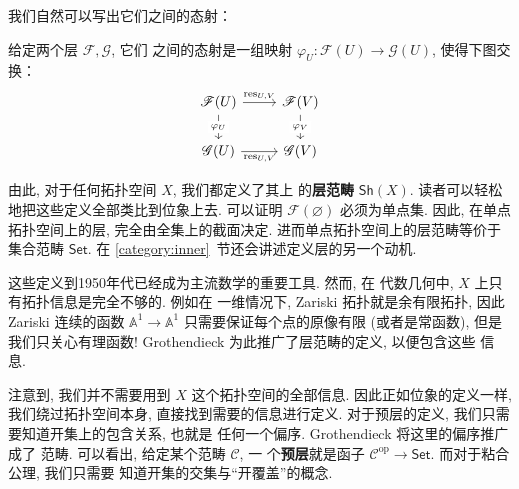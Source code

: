 我们自然可以写出它们之间的态射：
\begin{definition}
给定两个层 \(\mathscr F, \mathscr G\), 它们
之间的态射是一组映射 \(\varphi_U : \mathscr F(U) \to \mathscr G(U)\),
使得下图交换：
\[\begin{tikzcd}
{\mathscr F(U)} & {\mathscr F(V)} \\
{\mathscr G(U)} & {\mathscr G(V)}
\arrow["{\mathrm{res}_{U,V}}", from=1-1, to=1-2]
\arrow["{\mathrm{res}_{U,V}}"', from=2-1, to=2-2]
\arrow["{\varphi_U}"{description}, from=1-1, to=2-1]
\arrow["{\varphi_V}"{description}, from=1-2, to=2-2]
\end{tikzcd}\]
\end{definition}
由此, 对于任何拓扑空间 \(X\), 我们都定义了其上
的\textbf{层范畴} \(\mathsf{Sh}(X)\).
读者可以轻松地把这些定义全部类比到位象上去.
可以证明 \(\mathscr F(\varnothing)\) 必须为单点集.
因此, 在单点拓扑空间上的层, 完全由全集上的截面决定.
进而单点拓扑空间上的层范畴等价于集合范畴 \(\mathsf{Set}\).
在 \ref{category:inner}~节还会讲述定义层的另一个动机.

这些定义到1950年代已经成为主流数学的重要工具. 然而, 在
代数几何中, \(X\) 上只有拓扑信息是完全不够的. 例如在
一维情况下, Zariski 拓扑就是余有限拓扑, 因此 Zariski
连续的函数 \(\mathbb A^1 \to \mathbb A^1\)
只需要保证每个点的原像有限 (或者是常函数), 但是我们只关心有理函数!
Grothendieck 为此推广了层范畴的定义, 以便包含这些
信息.

注意到, 我们并不需要用到 \(X\) 这个拓扑空间的全部信息.
因此正如位象的定义一样, 我们绕过拓扑空间本身, 直接找到需要的信息进行定义.
对于预层的定义, 我们只需要知道开集上的包含关系, 也就是
任何一个偏序. Grothendieck 将这里的偏序推广成了
范畴. 可以看出, 给定某个范畴 \(\mathcal C\), 一
个\textbf{预层}就是函子 \(\mathcal C^{\mathrm{op}}
\to \mathsf{Set}\). 而对于粘合公理, 我们只需要
知道开集的交集与“开覆盖”的概念.

